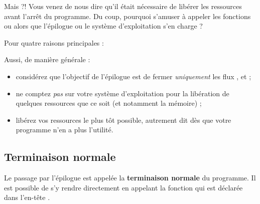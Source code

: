 \begin{questionbox} 
 Mais ?! Vous venez de nous dire qu'il
était nécessaire de libérer les ressources avant l'arrêt du programme.
Du coup, pourquoi s'amuser à appeler les fonctions  ou
 alors que l'épilogue ou le système d'exploitation s'en
charge ?
\end{questionbox}


Pour quatre raisons principales :


\begin{attentionbox}
 Aussi, de manière générale :
 \begin{itemize}
  \item 
considérez que l'objectif de l'épilogue est de fermer \emph{uniquement} 
les flux ,  et  ; 
  \item 
ne comptez \emph{pas} sur votre système d'exploitation pour la libération
de quelques ressources que ce soit (et notamment la mémoire) ;
  \item 
libérez vos ressources le plus tôt possible, autrement dit dès que votre 
programme n'en a plus l'utilité.
  \end{itemize}
\end{attentionbox}


\subsection{Terminaison normale}
\label{terminaison-normale}

Le passage par l'épilogue est appelée la \textbf{terminaison normale} du
programme. Il est possible de s'y rendre directement en appelant la
fonction  qui est déclarée dans l'en-tête
.

